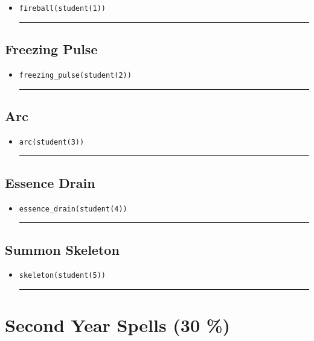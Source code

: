 \documentclass[11pt, onside]{article}
\newcommand{\matlab}[1]{\lstinline[style=Matlab-editor]!#1!}
\newcommand{\shortresponserule}{{\large\rule{5 cm}{0.3mm}}}
\begin{document}


\begin{itemize}
    \item \matlab{fireball(student(1))} \hfill \shortresponserule
\end{itemize}

\subsection{Freezing Pulse}



\begin{itemize}
    \item \matlab{freezing_pulse(student(2))} \hfill \shortresponserule
\end{itemize}

\subsection{Arc}


\begin{itemize}
    \item \matlab{arc(student(3))} \hfill \shortresponserule
\end{itemize}

\subsection{Essence Drain}


\begin{itemize}
    \item \matlab{essence_drain(student(4))} \hfill \shortresponserule
\end{itemize}

\subsection{Summon Skeleton}


\begin{itemize}
    \item \matlab{skeleton(student(5))} \hfill \shortresponserule
\end{itemize}

\pagebreak

\section{Second Year Spells (30 \%)}
\end{document}
